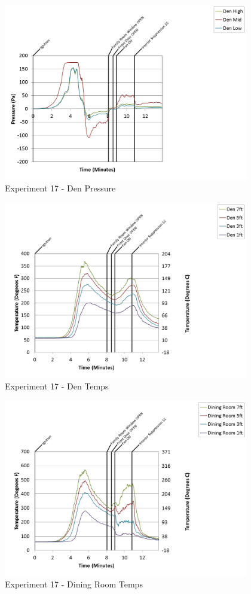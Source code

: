\documentclass{article}
\begin{document}
\begin{appendices}
\clearpage

\begin{figure}[h!]
	\centering
	\includegraphics[height=3.05in]{0_Images/Results_Charts/Exp_17_Charts/DenPressure.png}
	\caption{Experiment 17 - Den Pressure}
\end{figure}


\begin{figure}[h!]
	\centering
	\includegraphics[height=3.05in]{0_Images/Results_Charts/Exp_17_Charts/DenTemps.png}
	\caption{Experiment 17 - Den Temps}
\end{figure}

\clearpage

\begin{figure}[h!]
	\centering
	\includegraphics[height=3.05in]{0_Images/Results_Charts/Exp_17_Charts/DiningRoomTemps.png}
	\caption{Experiment 17 - Dining Room Temps}
\end{figure}



\end{appendices}
\end{document}
